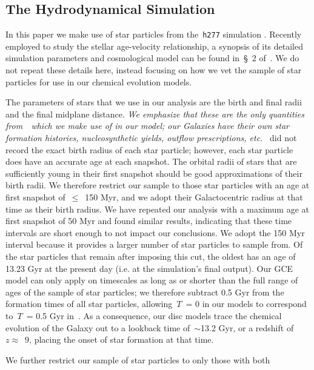\subsection{The Hydrodynamical Simulation} 
\label{migration:sec:methods:h277} 
In this paper we make use of star particles from the~\texttt{h277} simulation 
\citep{Christensen2012, Zolotov2012, Loebman2012, Loebman2014, Brooks2014}. 
Recently employed to study the stellar age-velocity relationship, a synopsis of 
its detailed simulation parameters and cosmological model can be found in~\S~2 
of~\citet{Bird2021}. 
We do not repeat these details here, instead focusing on how we vet the sample 
of star particles for use in our chemical evolution models. 
\par 
The parameters of stars that we use in our analysis are the birth and final 
radii and the final midplane distance. 
\textit{
	We emphasize that these are the only quantities from~\hsim~which we make 
	use of in our model; our Galaxies have their own star formation histories, 
	nucleosynthetic yields, outflow prescriptions, etc.
}
\hsim~did not record the exact birth radius of each star particle; however, 
each star particle does have an accurate age at each snapshot. 
The orbital radii of stars that are sufficiently young in their first snapshot 
should be good approximations of their birth radii. 
We therefore restrict our sample to those star particles with an age at first 
snapshot of~$\leq$~150 Myr, and we adopt their Galactocentric radius at that 
time as their birth radius. 
We have repeated our analysis with a maximum age at first snapshot of 50 
Myr and found similar results, indicating that these time intervals are short 
enough to not impact our conclusions. 
We adopt the 150 Myr interval because it provides a larger number of star 
particles to sample from. 
Of the star particles that remain after imposing this cut, the oldest has an 
age of 13.23 Gyr at the present day (i.e. at the simulation's final output). 
Our GCE model can only apply on timescales as long as or shorter than the full 
range of ages of the sample of star particles; we therefore subtract 0.5 Gyr 
from the formation times of all star particles, allowing~$T$~= 0 in our models 
to correspond to~$T$~= 0.5 Gyr in~\hsim. 
As a consequence, our disc models trace the chemical evolution of the Galaxy 
out to a lookback time of~$\sim$13.2 Gyr, or a redshift of~$z \approx$~9, 
placing the onset of star formation at that time. 
\par 
We further restrict our sample of star particles to only those with both 
